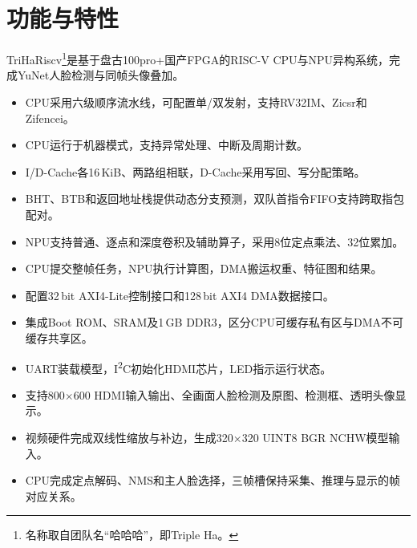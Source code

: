 \section{功能与特性}

TriHaRiscv\footnote{名称取自团队名“哈哈哈”，即Triple Ha。}是基于盘古100pro+国产FPGA的RISC-V CPU与NPU异构系统，完成YuNet人脸检测与同帧头像叠加。

\begin{itemize}
    \item CPU采用六级顺序流水线，可配置单/双发射，支持RV32IM、Zicsr和Zifencei。
    \item CPU运行于机器模式，支持异常处理、中断及周期计数。
    \item I/D-Cache各16\,KiB、两路组相联，D-Cache采用写回、写分配策略。
    \item BHT、BTB和返回地址栈提供动态分支预测，双队首指令FIFO支持跨取指包配对。
    \item NPU支持普通、逐点和深度卷积及辅助算子，采用8位定点乘法、32位累加。
    \item CPU提交整帧任务，NPU执行计算图，DMA搬运权重、特征图和结果。
    \item 配置32\,bit AXI4-Lite控制接口和128\,bit AXI4 DMA数据接口。
    \item 集成Boot ROM、SRAM及1\,GB DDR3，区分CPU可缓存私有区与DMA不可缓存共享区。
    \item UART装载模型，I\textsuperscript{2}C初始化HDMI芯片，LED指示运行状态。
    \item 支持800$\times$600 HDMI输入输出、全画面人脸检测及原图、检测框、透明头像显示。
    \item 视频硬件完成双线性缩放与补边，生成320$\times$320 UINT8 BGR NCHW模型输入。
    \item CPU完成定点解码、NMS和主人脸选择，三帧槽保持采集、推理与显示的帧对应关系。
\end{itemize}
